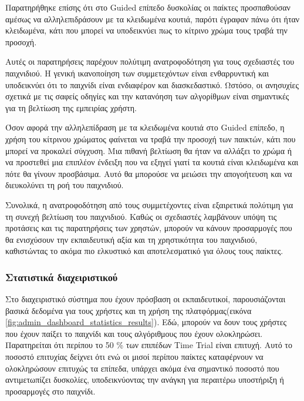 Παρατηρήθηκε επίσης ότι στο Guided επίπεδο δυσκολίας οι παίκτες προσπαθούσαν αμέσως να αλληλεπιδράσουν με τα κλειδωμένα κουτιά, παρότι έγραφαν πάνω ότι ήταν κλειδωμένα, κάτι που μπορεί να υποδεικνύει πως το κίτρινο χρώμα τους τραβά την προσοχή.

Αυτές οι παρατηρήσεις παρέχουν πολύτιμη ανατροφοδότηση για τους σχεδιαστές του παιχνιδιού. Η γενική ικανοποίηση των συμμετεχόντων είναι ενθαρρυντική και υποδεικνύει ότι το παιχνίδι είναι ενδιαφέρον και διασκεδαστικό. Ωστόσο, οι ανησυχίες σχετικά με τις σαφείς οδηγίες και την κατανόηση των αλγορίθμων είναι σημαντικές για τη βελτίωση της εμπειρίας χρήστη.

Όσον αφορά την αλληλεπίδραση με τα κλειδωμένα κουτιά στο Guided επίπεδο, η χρήση του κίτρινου χρώματος φαίνεται να τραβά την προσοχή των παικτών, κάτι που μπορεί να προκαλεί σύγχυση. Μια πιθανή βελτίωση θα ήταν να αλλάξει το χρώμα ή να προστεθεί μια επιπλέον ένδειξη που να εξηγεί γιατί τα κουτιά είναι κλειδωμένα και πότε θα γίνουν προσβάσιμα. Αυτό θα μπορούσε να μειώσει την απογοήτευση και να διευκολύνει τη ροή του παιχνιδιού.

Συνολικά, η ανατροφοδότηση από τους συμμετέχοντες είναι εξαιρετικά πολύτιμη για τη συνεχή βελτίωση του παιχνιδιού. Καθώς οι σχεδιαστές λαμβάνουν υπόψη τις προτάσεις και τις παρατηρήσεις των χρηστών, μπορούν να κάνουν προσαρμογές που θα ενισχύσουν την εκπαιδευτική αξία και τη χρηστικότητα του παιχνιδιού, καθιστώντας το ακόμα πιο ελκυστικό και αποτελεσματικό για όλους τους παίκτες.


\subsubsection{Στατιστικά διαχειριστικού}

Στο διαχειριστικό σύστημα που έχουν πρόσβαση οι εκπαιδευτικοί, παρουσιάζονται βασικά δεδομένα για τους χρήστες και τη χρήση της πλατφόρμας(εικόνα \ref{fig:admin_dashboard_statistics_results}). Εδώ, μπορούν να δουν τους χρήστες που έχουν παίξει το παιχνίδι και τους αλγόριθμους που έχουν ολοκληρώσει. Παρατηρείται ότι περίπου το 50 \% των επιπέδων Time Trial είναι επιτυχή. Αυτό το ποσοστό επιτυχίας δείχνει ότι ενώ οι μισοί περίπου παίκτες καταφέρνουν να ολοκληρώσουν επιτυχώς τα επίπεδα, υπάρχει ακόμα ένα σημαντικό ποσοστό που αντιμετωπίζει δυσκολίες, υποδεικνύοντας την ανάγκη για περαιτέρω υποστήριξη ή προσαρμογές στο παιχνίδι.

